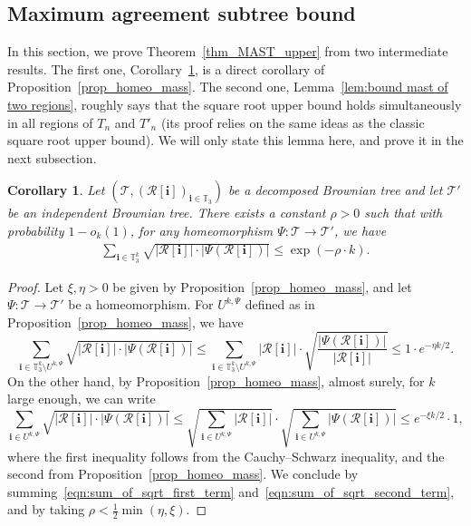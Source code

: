 \documentclass[JEP,XML,SOM,Unicode,NoFloatCountersInSection,published]{cedram}
\newcommand{\Tt}{\mathcal{T}}
\newcommand{\Rr}{\mathcal{R}}
\newcommand{\ii}{\mathbf{i}}
\theoremstyle{plain}
\newtheorem{corollary}[theorem]{Corollary}
\theoremstyle{definition}
\begin{document}
\subsection{Maximum agreement subtree bound}
In this section, we prove Theorem~\ref{thm_MAST_upper} from two intermediate results.
The first one, Corollary~\ref{prop:sum sqrt prod mass}, is a direct corollary of Proposition~\ref{prop_homeo_mass}. The second one, Lemma~\ref{lem:bound mast of two regions}, roughly says that the square root upper bound holds simultaneously in all regions of $T_n$ and $T'_n$ (its proof relies on the same ideas as the classic square root upper bound).
We will only state this lemma here, and prove it in the next subsection.
\begin{corollary}\label{prop:sum sqrt prod mass}
Let $\left( \mathcal{T}, \left( \Rr[\ii] \right)_{\ii \in \mathbb{T}_3} \right)$ be a decomposed Brownian tree and let $\mathcal{T}'$ be an independent Brownian tree. There exists a constant $\rho>0$ such that with probability $1-o_k(1)$, for any homeomorphism $\Psi: \mathcal T \rightarrow \mathcal{T}'$, we have\vspace*{-3pt}
\begin{align*}
\sum_{\ii \in \mathbb{T}_3^k} \sqrt{|\Rr[\ii] | \cdot |\Psi(\Rr[\ii] )|} \leq \exp(- \rho \cdot k).
\end{align*}
\end{corollary}
\begin{proof}
Let $\xi, \eta>0$ be given by Proposition~\ref{prop_homeo_mass}, and let $\Psi : \Tt \to \Tt'$ be a homeomorphism.
For $U^{k,\Psi}$ defined as in Proposition~\ref{prop_homeo_mass}, we have\vspace*{-3pt}
\begin{equation}\label{eqn:sum_of_sqrt_first_term}
\sum_{\ii \in \mathbb{T}_3^k\setminus U^{k,\Psi}} \sqrt{|\Rr[\ii] | \cdot |\Psi(\Rr[\ii] )|} \leq \sum_{\ii \in \mathbb{T}_3^k\setminus U^{k,\Psi}} |\Rr[\ii] | \cdot \sqrt{ \frac{|\Psi(\Rr[\ii] )|}{|\Rr[\ii] |}} \leq 1 \cdot e^{-\eta k/2}.
\end{equation}
On the other hand, by Proposition~\ref{prop_homeo_mass}, almost surely, for $k$ large enough, we can write\vspace*{-3pt}
\begin{equation}\label{eqn:sum_of_sqrt_second_term}
\sum_{\ii \in U^{k,\Psi}} \sqrt{|\Rr[\ii] | \cdot |\Psi(\Rr[\ii] )|} \leq \sqrt{\sum_{\ii \in U^{k,\Psi}} |\Rr[\ii] | }\cdot \sqrt{\sum_{\ii \in U^{k,\Psi}} |\Psi(\Rr[\ii] )|} \leq e^{-\xi k/2} \cdot 1,
\end{equation}
where the first inequality follows from the Cauchy--Schwarz inequality, and the second from Proposition~\ref{prop_homeo_mass}. We conclude by summing~\eqref{eqn:sum_of_sqrt_first_term} and~\eqref{eqn:sum_of_sqrt_second_term}, and by taking $\rho<\frac{1}{2}\min(\eta, \xi)$.
\end{proof}
\end{document}
